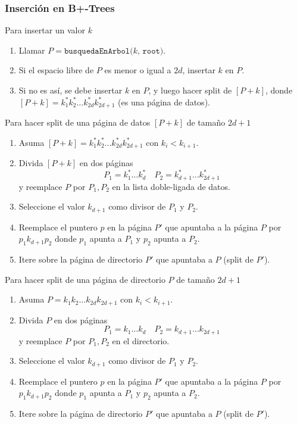 
\subsubsection{Inserción en B+-Trees}
Para insertar un valor $k$
\begin{enumerate}
  \item Llamar $P = \texttt{busquedaEnArbol($k$, root)}$.
  \item Si el espacio libre de $P$ es menor o igual a $2d$, insertar $k$ en $P$.
  \item Si no es así, se debe insertar $k$ en $P$, y luego hacer split de $[P + k]$, donde $[P + k] = k_1^* k_2^* \ldots k_{2d}^* k_{2d+1}^*$ (es una página de datos).
\end{enumerate}

Para hacer split de una página de datos $[P + k]$ de tamaño $2d + 1$
\begin{enumerate}
  \item Asuma $[P + k] = k_1^* k_2^* \ldots k_{2d}^* k_{2d+1}^*$ con $k_i < k_{i+1}$.
  \item Divida $[P + k]$ en dos páginas
  \[ P_1 = k_1^* \ldots k_d^* \quad P_2 = k_{d+1}^* \ldots k_{2d+1}^* \]
  y reemplace $P$ por $P_1, P_2$ en la lista doble-ligada de datos.
  \item Seleccione el valor $k_{d+1}$ como divisor de $P_1$ y $P_2$.
  \item Reemplace el puntero $p$ en la página $P'$ que apuntaba a la página $P$ por $p_1 k_{d+1} p_2$ donde $p_1$ apunta a $P_1$ y $p_2$ apunta a $P_2$.
  \item Itere sobre la página de directorio $P'$ que apuntaba a $P$ (split de $P'$).
\end{enumerate}

Para hacer split de una página de directorio $P$ de tamaño $2d + 1$
\begin{enumerate}
  \item Asuma $P = k_1 k_2 \ldots k_{2d} k_{2d+1}$ con $k_i < k_{i+1}$.
  \item Divida $P$ en dos páginas
  \[ P_1 = k_1 \ldots k_d \quad P_2 = k_{d+1} \ldots k_{2d+1} \]
  y reemplace $P$ por $P_1, P_2$ en el directorio.
  \item Seleccione el valor $k_{d+1}$ como divisor de $P_1$ y $P_2$.
  \item Reemplace el puntero $p$ en la página $P'$ que apuntaba a la página $P$ por $p_1 k_{d+1} p_2$ donde $p_1$ apunta a $P_1$ y $p_2$ apunta a $P_2$.
  \item Itere sobre la página de directorio $P'$ que apuntaba a $P$ (split de $P'$).
\end{enumerate}

